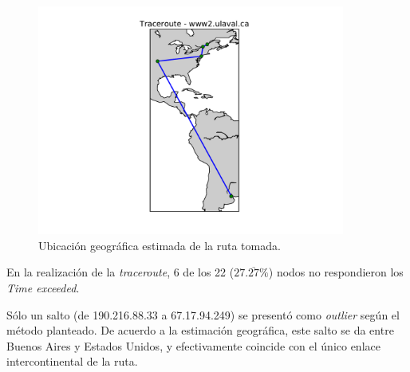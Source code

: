 \begin{figure}
    \centering
    \includegraphics[width=0.9\textwidth]{img/grafico3-www2-ulaval-ca.pdf}
    \caption{Ubicación geográfica estimada de la ruta tomada.}
\end{figure}

\par En la realización de la \textit{traceroute}, 6 de los 22 ($27.\overline{27}\%$) nodos no respondieron los \textit{Time exceeded}.

\par Sólo un salto (de 190.216.88.33 a 67.17.94.249) se presentó como \textit{outlier} según el método planteado.
De acuerdo a la estimación geográfica, este salto se da entre Buenos Aires y Estados Unidos, y efectivamente coincide con el único enlace intercontinental de la ruta.
